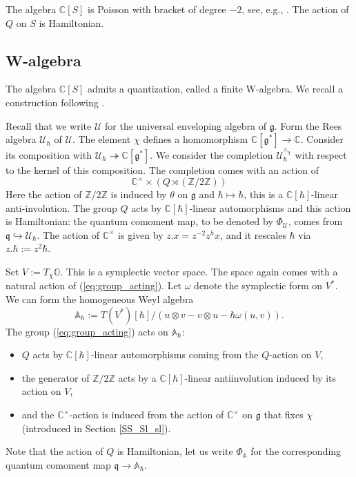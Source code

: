 \documentclass[12pt]{amsart}
\newcommand{\C}{\mathbb{C}}
\newcommand{\U}{\mathcal{U}}
\newcommand{\g}{\mathfrak{g}}
\newcommand{\Orb}{\mathbb{O}}
\newcommand{\Z}{\mathbb{Z}}
\newcommand{\q}{\mathfrak{q}}
\newcommand{\Weyl}{\mathbb{A}}
\theoremstyle{definition}
\numberwithin{equation}{section}
\begin{document}
The algebra $\C[S]$ is Poisson with bracket of degree $-2$, see, e.g., \cite[Section 2]{GG}. The action of
$Q$ on $S$ is Hamiltonian.

\subsection{W-algebra}\label{SS_W_alg} The algebra $\C[S]$ admits a quantization, called a
finite W-algebra. We recall a construction following \cite[Sections 2.1,2.2]{W_prim}.

Recall that we write $\U$ for the universal enveloping algebra of $\g$.
Form the Rees algebra $\U_\hbar$ of $\U$. The element $\chi$ defines a
homomorphism $\C[\g^*]\rightarrow \C$. Consider its composition
with $\U_\hbar\twoheadrightarrow \C[\g^*]$. We consider the completion
$\U_\hbar^{\wedge_\chi}$ with respect to the kernel of this composition. The completion comes with an action of
\begin{equation}\label{eq:group_acting} \C^\times \times \left(Q\rtimes (\Z/2\Z)\right)
\end{equation}
Here the action of $\Z/2\Z$ is induced by
$\theta$ on $\g$ and $\hbar\mapsto\hbar$, this is a $\C[\hbar]$-linear
anti-involution. The group $Q$ acts by $\C[\hbar]$-linear automorphisms and
this action is Hamiltonian: the quantum comoment map, to be denoted by $\Phi_\U$, comes from $\mathfrak{q}\hookrightarrow
\U_\hbar$. The action of $\C^\times$ is given by $z.x=z^{-2}z^hx$, and it rescales $\hbar$ via $z.\hbar := z^2\hbar$.

Set $V:=T_\chi\Orb$. This is  a symplectic vector space.
The space again comes with a natural action of
(\ref{eq:group_acting}). Let $\omega$ denote the symplectic form on
$V^*$. We can form the homogeneous Weyl algebra
$$\Weyl_\hbar:=T(V^*)[\hbar]/(u\otimes v-v\otimes u-\hbar\omega(u,v)).$$
The group (\ref{eq:group_acting}) acts on $\Weyl_\hbar$:
\begin{itemize}
\item $Q$ acts by
$\C[\hbar]$-linear automorphisms coming from the $Q$-action on $V$,
\item the generator of $\Z/2\Z$ acts by a
$\C[\hbar]$-linear antiinvolution induced by its action on $V$,
\item and the $\C^\times$-action is induced from the action of $\C^\times$ on $\g$
that fixes $\chi$ (introduced in Section \ref{SS_Sl_sl}).
\end{itemize}
Note that the action of $Q$ is Hamiltonian, let us
write $\Phi_{\Weyl}$ for the corresponding quantum comoment map
$\q\rightarrow \Weyl_\hbar$.
\end{document}
